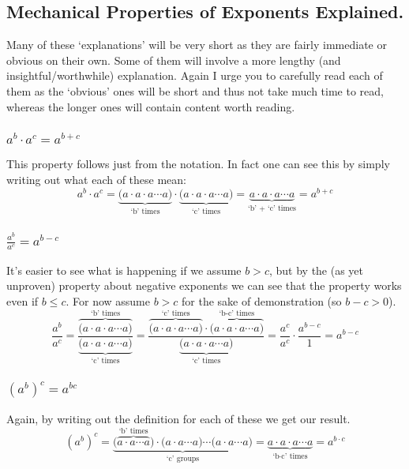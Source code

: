 \documentclass{ximeraXloud}
\begin{document}
\subsection*{Mechanical Properties of Exponents Explained.}
    Many of these `explanations' will be very short as they are fairly immediate or obvious on their own. Some of them will involve a more lengthy (and insightful/worthwhile) explanation. Again I urge you to carefully read each of them as the `obvious' ones will be short and thus not take much time to read, whereas the longer ones will contain content worth reading.
    
    \subsubsection*{$a^b \cdot a^c = a^{b+c}$}
    
        This property follows just from the notation. In fact one can see this by simply writing out what each of these mean:
        \[
            a^b\cdot a^c = \underbrace{\big(a\cdot a\cdot a \cdots a\big)}_\text{`b' times}\cdot 
                \underbrace{\big(a\cdot a\cdot a \cdots a\big)}_\text{`c' times} =
                \underbrace{a\cdot a\cdot a \cdots a}_\text{`b' + `c' times} = a^{b+c}
        \]
    
    \subsubsection*{$\frac{a^b}{a^c} = a^{b-c}$}
        
        It's easier to see what is happening if we assume $b > c$, but by the (as yet unproven) property about negative exponents we can see that the property works even if $b \leq c$. For now assume $b > c$ for the sake of demonstration (so $b-c > 0$).
        \[
            \frac{a^b}{a^c} = 
                \frac{\overbrace{\big(a\cdot a\cdot a \cdots a\big)}^\text{`b' times}}{
                \underbrace{\big(a\cdot a\cdot a \cdots a\big)}_\text{`c' times}} =
                \frac{\overbrace{\big(a\cdot a\cdot a \cdots a\big)}^\text{`c' times}\cdot\overbrace{\big(a\cdot a\cdot a \cdots a\big)}^\text{`b-c' times}}{
                \underbrace{\big(a\cdot a\cdot a \cdots a\big)}_\text{`c' times}} =
                \frac{a^c}{a^c}\cdot \frac{a^{b-c}}{1} = a^{b-c}
        \]
    
    \subsubsection*{$\left(a^b\right)^c = a^{bc}$}
        Again, by writing out the definition for each of these we get our result.
        \[
            \left(a^b\right)^c = 
                \underbrace{\big(\overbrace{a \cdot a \cdots a}^\text{`b' times}\big)\cdot \big(a \cdot a \cdots a\big) \cdots \big(a \cdot a \cdots a\big)}_\text{`c' groups} =
                \underbrace{a \cdot a \cdot a \cdots a}_{\text{`b} \cdot \text{c' times}} =
                a^{b\cdot c} 
        \]
        
\end{document}
